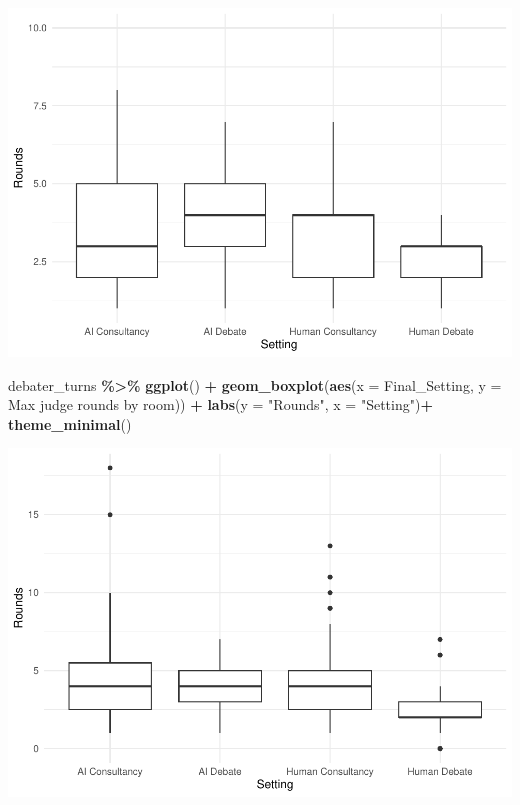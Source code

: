 \documentclass[
]{article}
\newenvironment{Shaded}{\begin{snugshade}}{\end{snugshade}}
\newcommand{\AttributeTok}[1]{\textcolor[rgb]{0.13,0.29,0.53}{#1}}
\newcommand{\FunctionTok}[1]{\textcolor[rgb]{0.13,0.29,0.53}{\textbf{#1}}}
\newcommand{\NormalTok}[1]{#1}
\newcommand{\SpecialCharTok}[1]{\textcolor[rgb]{0.81,0.36,0.00}{\textbf{#1}}}
\newcommand{\StringTok}[1]{\textcolor[rgb]{0.31,0.60,0.02}{#1}}
\begin{document}
\includegraphics[width=1\linewidth]{debate-2309_files/figure-latex/rounds graph-2}

\begin{Shaded}
\begin{Highlighting}[]
\NormalTok{debater\_turns }\SpecialCharTok{\%\textgreater{}\%}
  \FunctionTok{ggplot}\NormalTok{() }\SpecialCharTok{+}
  \FunctionTok{geom\_boxplot}\NormalTok{(}\FunctionTok{aes}\NormalTok{(}\AttributeTok{x =}\NormalTok{ Final\_Setting, }\AttributeTok{y =} \StringTok{\textasciigrave{}}\AttributeTok{Max judge rounds by room}\StringTok{\textasciigrave{}}\NormalTok{)) }\SpecialCharTok{+}
  \FunctionTok{labs}\NormalTok{(}\AttributeTok{y =} \StringTok{"Rounds"}\NormalTok{, }\AttributeTok{x =} \StringTok{"Setting"}\NormalTok{)}\SpecialCharTok{+}
  \FunctionTok{theme\_minimal}\NormalTok{()}
\end{Highlighting}
\end{Shaded}

\includegraphics[width=1\linewidth]{debate-2309_files/figure-latex/rounds graph-3}
\end{document}
